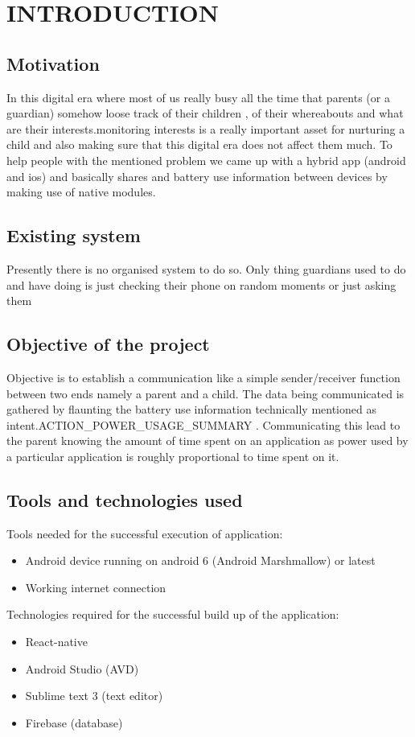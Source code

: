  \chapter{INTRODUCTION}
 
\section{Motivation}
In this digital era where most of us really busy all the time that parents (or a guardian) somehow loose track of their children , of their whereabouts and what are their interests.monitoring interests is a really important asset for nurturing a child and also making sure that this digital era does not affect them much. To help people with the mentioned problem we came up with a hybrid app (android and ios) and basically shares and battery use information between devices by making use of native modules.

\section{Existing system}
Presently there is no organised system to do so. Only thing guardians used to do and have doing is just checking their phone on random moments or just asking them
  
\section{Objective of the project}
Objective is to establish a communication like a simple sender/receiver function between two ends namely a parent and a child. The data being communicated is gathered by flaunting the battery use information technically mentioned as intent.ACTION\_POWER\_USAGE\_SUMMARY . Communicating this lead to the parent knowing the amount of time spent on an application as power used by a particular application is roughly proportional to time spent on it.

\section{Tools and technologies used}
Tools needed for the successful execution of application:
\begin{itemize}
	\item Android device running on android 6 (Android Marshmallow) or latest
	\item Working internet connection
\end{itemize}
\vspace{3cm}
Technologies required for the successful build up of the application: 
\begin{itemize}
	\item React-native
	\item Android Studio (AVD)
	\item Sublime text 3 (text editor)
	\item Firebase (database)
\end{itemize}

